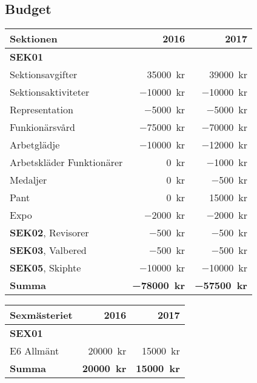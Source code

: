 \documentclass[10pt]{article}
\begin{document}
\section*{\doctitle}

\subsection*{Budget}
\begin{tabularx}{10cm}{X r r}
    \textbf{\large Sektionen} & \textbf{2016} & \textbf{2017} \\
    \hline
    \textbf{SEK01} \\
    Sektionsavgifter & \SI{35000}{kr} & \SI{39000}{kr} \\
    Sektionsaktiviteter & \SI{-10000}{kr} & \SI{-10000}{kr} \\
    Representation & \SI{-5000}{kr} & \SI{-5000}{kr} \\
    Funkionärsvård & \SI{-75000}{kr} & \SI{-70000}{kr} \\
    Arbetglädje & \SI{-10000}{kr} & \SI{-12000}{kr} \\
    Arbetskläder Funktionärer & \SI{0}{kr} & \SI{-1000}{kr} \\
    Medaljer & \SI{0}{kr} & \SI{-500}{kr} \\
    Pant & \SI{0}{kr} & \SI{15000}{kr} \\
    Expo & \SI{-2000}{kr} & \SI{-2000}{kr} \\
    \textbf{SEK02}, Revisorer & \SI{-500}{kr} & \SI{-500}{kr} \\
    \textbf{SEK03}, Valbered & \SI{-500}{kr} & \SI{-500}{kr} \\
    \textbf{SEK05}, Skiphte & \SI{-10000}{kr} & \SI{-10000}{kr} \\
    \hline
    \textbf{Summa} & \textbf{\SI{-78000}{kr}} & \textbf{\SI{-57500}{kr}} \\
\end{tabularx}

\begin{tabularx}{10cm}{X r r}
    \textbf{\large Sexmästeriet} & \textbf{2016} & \textbf{2017} \\
    \hline
    \textbf{SEX01} \\
    E6 Allmänt & \SI{20000}{kr} & \SI{15000}{kr} \\
    \hline
    \textbf{Summa} & \textbf{\SI{20000}{kr}} & \textbf{\SI{15000}{kr}} \\
\end{tabularx}
\end{document}
